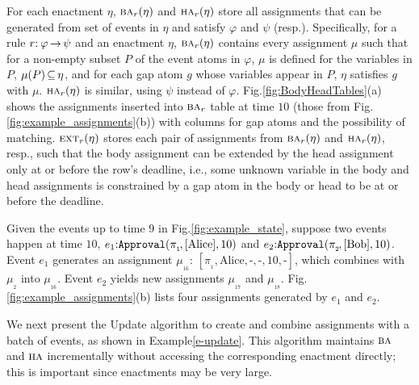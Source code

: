 For each enactment $\eta$,
$\BODY/_r(\eta)$ and $\HEAD/_r(\eta)$
store all assignments
that can be generated from set of events in $\eta$
and
satisfy $\varphi$ and $\psi$ (resp.).
Specifically,
for a rule $r{:}\:\varphi\,{\rightarrow}\,\psi$
and an enactment $\eta$,
$\BODY/_r(\eta)$ contains every assignment $\mu$ such that
for a non-empty subset $P$ of the event atoms in $\varphi$,
$\mu$ is defined for the variables in $P$,
$\mu(P)\,{\subseteq}\, \eta$,
and 
for each gap atom $g$ whose variables appear in $P$, 
$\eta$ satisfies $g$ with $\mu$.
$\HEAD/_r(\eta)$ is similar, using $\psi$ instead of $\varphi$.
Fig.\:\ref{fig:BodyHeadTables}(a)
shows the assignments inserted into $\BODY/_r$ table
at time $10$ (those from Fig.\:\ref{fig:example_assignments}(b))
with columns for gap atoms and the possibility of matching.
$\textsc{ext}_r(\eta)$ stores each pair of assignments
from $\BODY/_r(\eta)$ and $\HEAD/_r(\eta)$, resp.,
such that the body assignment can be extended
by the head assignment
only at or before the row's deadline,
i.e., some unknown variable in the body and head assignments
is constrained by a gap atom in the body or head
to be at or before the deadline.

{\BodyAssignNew}

\begin{examp}\label{e-update}
Given the events up to time $9$ in Fig.\:\ref{fig:example_state},
suppose two events happen at time $10$,
$e_1{:}\texttt{Approval}(\pi_{_1\!},[\mbox{Alice}],10)$
and
$e_2{:}\texttt{Approval}(\pi_{_2\!},[\mbox{Bob}],10)$.
Event $e_1$ generates an assignment
$\mu_{_{16}}{:}\,[\pi_{_1}\!,\allowbreak\mbox{Alice},\mbox{-},\mbox{-},10,\mbox{-}]$,
which combines with $\mu_{_2}$ into $\mu_{_{16}}$.
Event $e_2$ yields
new assignments
$\mu_{_{17}}$
and
$\mu_{_{18}}$.
Fig.\,\ref{fig:example_assignments}(b)
lists four assignments generated by $e_1$ and $e_2$.
\end{examp}

{\BodyHeadTables}

{\ExtensionTable}

We next present the {\sf Update} algorithm
to create and combine assignments
with a batch of events,
as shown in Example\:\ref{e-update}.
This algorithm maintains
$\BODY/$ and $\HEAD/$ incrementally
without accessing the corresponding enactment directly;
this is important
since enactments may be very large.




